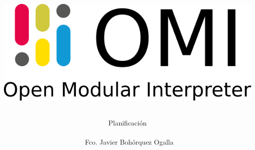 \documentclass[12pt, spanish]{article}
\author{Planificación\\\\\ Fco. Javier Bohórquez Ogalla}						%
\date{}														%
\title{ 
\begin{center}
\includegraphics[scale=0.5]{logo-doc.png}
\end{center} 
}
\begin{document}
\maketitle
\pagebreak
\tableofcontents
\pagebreak

\end{document}

